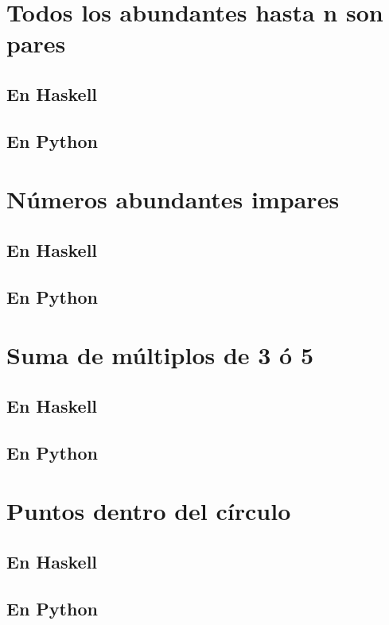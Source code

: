 \documentclass[a4paper,12pt,twoside]{book}
\begin{document}
\section{Todos los abundantes hasta n son pares}
\subsection*{En Haskell}
\subsection*{En Python}

\section{Números abundantes impares}
\subsection*{En Haskell}
\subsection*{En Python}

\section{Suma de múltiplos de 3 ó 5}
\subsection*{En Haskell}
\subsection*{En Python}

\section{Puntos dentro del círculo}
\subsection*{En Haskell}
\subsection*{En Python}
\end{document}
